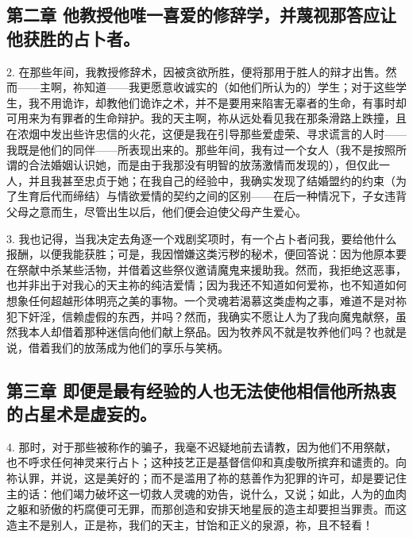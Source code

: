 \subsection{第二章 他教授他唯一喜爱的修辞学，并蔑视那答应让他获胜的占卜者。}

2. 在那些年间，我教授修辞术，因被贪欲所胜，便将那用于胜人的辩才出售。然而——主啊，祢知道——我更愿意收诚实的（如他们所认为的）学生；对于这些学生，我不用诡诈，却教他们诡诈之术，并不是要用来陷害无辜者的生命，有事时却可用来为有罪者的生命辩护。我的天主啊，祢从远处看见我在那条滑路上跌撞，且在浓烟中发出些许忠信的火花，这便是我在引导那些爱虚荣、寻求谎言的人时——我既是他们的同伴——所表现出来的。那些年间，我有过一个女人（我不是按照所谓的合法婚姻认识她，而是由于我那没有明智的放荡激情而发现的），但仅此一人，并且我甚至忠贞于她；在我自己的经验中，我确实发现了结婚盟约的约束（为了生育后代而缔结）与情欲爱情的契约之间的区别——在后一种情况下，子女违背父母之意而生，尽管出生以后，他们便会迫使父母产生爱心。\par

3. 我也记得，当我决定去角逐一个戏剧奖项时，有一个占卜者问我，要给他什么报酬，以便我能获胜；可是，我因憎嫌这类污秽的秘术，便回答说：因为他原本要在祭献中杀某些活物，并借着这些祭仪邀请魔鬼来援助我。然而，我拒绝这恶事，也并非出于对我心的天主祢的纯洁爱情；因为我还不知道如何爱祢，也不知道如何想象任何超越形体明亮之美的事物。一个灵魂若渴慕这类虚构之事，难道不是对祢犯下奸淫，信赖虚假的东西，并吗？然而，我确实不愿让人为了我向魔鬼献祭，虽然我本人却借着那种迷信向他们献上祭品。因为牧养风不就是牧养他们吗？也就是说，借着我们的放荡成为他们的享乐与笑柄。\par


\subsection{第三章 即便是最有经验的人也无法使他相信他所热衷的占星术是虚妄的。}

4. 那时，对于那些被称作的骗子，我毫不迟疑地前去请教，因为他们不用祭献，也不呼求任何神灵来行占卜；这种技艺正是基督信仰和真虔敬所摈弃和谴责的。向祢认罪，并说，这是美好的；而不是滥用了祢的慈善作为犯罪的许可，却是要记住主的话：他们竭力破坏这一切救人灵魂的劝告，说什么，又说；如此，人为的血肉之躯和骄傲的朽腐便可无罪，而那创造和安排天地星辰的造主却要担当罪责。而这造主不是别人，正是祢，我们的天主，甘饴和正义的泉源，祢，且不轻看！\par

